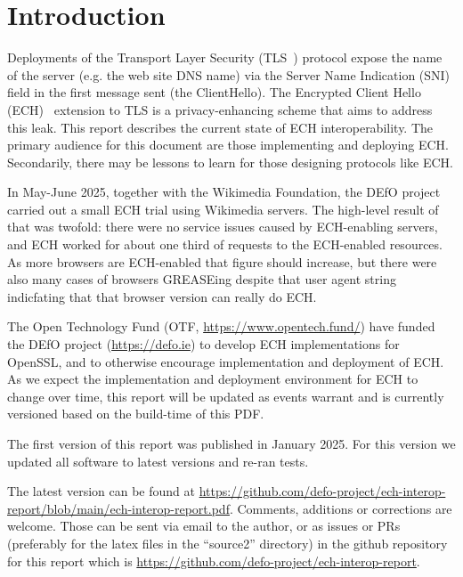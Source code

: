 \section{Introduction}

Deployments of the Transport Layer Security (TLS~\cite{rfc8446}) protocol
expose the name of the server (e.g. the web site DNS name) via the Server Name
Indication (SNI) field in the first message sent (the ClientHello).  The
Encrypted Client Hello (ECH)~\cite{ietf-tls-esni} extension to TLS is a
privacy-enhancing scheme that aims to address this leak.
This report describes the current state of ECH interoperability.
The primary audience for this document are those implementing and
deploying ECH. Secondarily, there may be lessons to learn for those
designing protocols like ECH.

In May-June 2025, together with the Wikimedia Foundation, the DEfO
project carried out a small ECH trial using Wikimedia servers.\cite{echtrial}
The high-level result of that was twofold: there were no service issues
caused by ECH-enabling servers, and ECH worked for about one third of
requests to the ECH-enabled resources. As more browsers are ECH-enabled
that figure should increase, but there were also many cases of browsers
GREASEing despite that user agent string indicfating that that browser
version can really do ECH.

The Open Technology Fund (OTF, \url{https://www.opentech.fund/}) have
funded the DEfO project (\url{https://defo.ie}) to develop
ECH implementations for OpenSSL, and to otherwise encourage implementation
and deployment of ECH.
As we expect the implementation and deployment environment for ECH to change
over time, this report will be updated as events warrant and is currently
versioned based on the build-time of this PDF.

The first version of this report was published in January 2025. \cite{echinterop1}
For this version we updated all software to latest versions and re-ran tests.

The latest version can be found at
\url{https://github.com/defo-project/ech-interop-report/blob/main/ech-interop-report.pdf}.
Comments, additions or corrections are welcome. Those can be sent via email to
the author, or as issues or PRs (preferably for the latex files in the
``source2'' directory) in the github repository for this report which is
\url{https://github.com/defo-project/ech-interop-report}.
